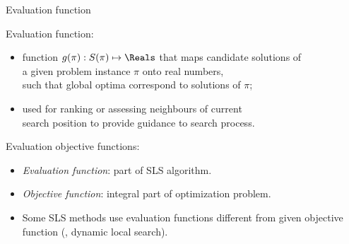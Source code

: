 \begin{frame}[c]{Evaluation function}

\onslide<+->
\begin{block}{Evaluation function:}
\begin{itemize}
\item function $g(\pi): S(\pi) \mapsto \Reals$ that maps candidate solutions of \\
        a given problem instance $\pi$ onto real numbers, \\
        such that global optima correspond to solutions of $\pi$;
\onslide<+->
\item used for ranking or assessing neighbours of current \\
        search position to provide guidance to search process.
\end{itemize}
\end{block}

\medskip

\onslide<+->
\begin{block}{Evaluation \vs{} objective functions:}
\begin{itemize}
\item \emph{Evaluation function}: part of SLS algorithm.
\item \emph{Objective function}: integral part of optimization problem.
\onslide<+->
\item Some SLS methods use evaluation functions different from
        given objective function (\eg{}, dynamic local search).
\end{itemize}
\end{block}

\end{frame}
% 
% 
